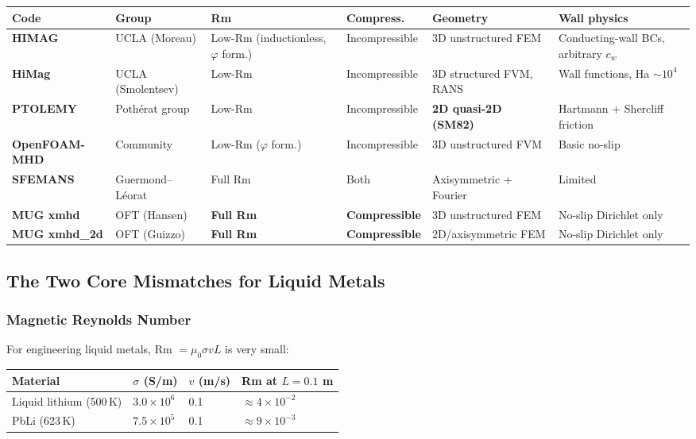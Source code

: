 \documentclass[11pt,letterpaper]{article}
\begin{document}
\begin{center}
\begin{longtable}{p{}p{}p{}p{}p{}p{}}
\toprule
\textbf{Code} & \textbf{Group} & \textbf{Rm} & \textbf{Compress.} & \textbf{Geometry} & \textbf{Wall physics} \\
\midrule
\textbf{HIMAG} & UCLA (Moreau) & Low-Rm (inductionless, $\varphi$ form.) & Incompressible & 3D unstructured FEM & Conducting-wall BCs, arbitrary $c_w$ \\
\addlinespace
\textbf{HiMag} & UCLA (Smolentsev) & Low-Rm & Incompressible & 3D structured FVM, RANS & Wall functions, Ha $\sim10^4$ \\
\addlinespace
\textbf{PTOLEMY} & Pothérat group & Low-Rm & Incompressible & \textbf{2D quasi-2D (SM82)} & Hartmann + Shercliff friction \\
\addlinespace
\textbf{OpenFOAM-MHD} & Community & Low-Rm ($\varphi$ form.) & Incompressible & 3D unstructured FVM & Basic no-slip \\
\addlinespace
\textbf{SFEMANS} & Guermond--Léorat & Full Rm & Both & Axisymmetric + Fourier & Limited \\
\addlinespace
\textbf{MUG xmhd} & OFT (Hansen) & \textbf{Full Rm} & \textbf{Compressible} & 3D unstructured FEM & No-slip Dirichlet only \\
\addlinespace
\textbf{MUG xmhd\_2d} & OFT (Guizzo) & \textbf{Full Rm} & \textbf{Compressible} & 2D/axisymmetric FEM & No-slip Dirichlet only \\
\bottomrule
\end{longtable}
\end{center}

\subsection{The Two Core Mismatches for Liquid Metals}

\subsubsection{Magnetic Reynolds Number}

For engineering liquid metals, Rm $= \mu_0 \sigma v L$ is very small:

\begin{center}
\begin{tabular}{llll}
\toprule
\textbf{Material} & $\sigma$ (S/m) & $v$ (m/s) & Rm at $L = 0.1$ m \\
\midrule
Liquid lithium (500\,K) & $3.0\times10^6$ & 0.1 & $\approx 4\times10^{-2}$ \\
PbLi (623\,K) & $7.5\times10^5$ & 0.1 & $\approx 9\times10^{-3}$ \\
\bottomrule
\end{tabular}
\end{center}
\end{document}
